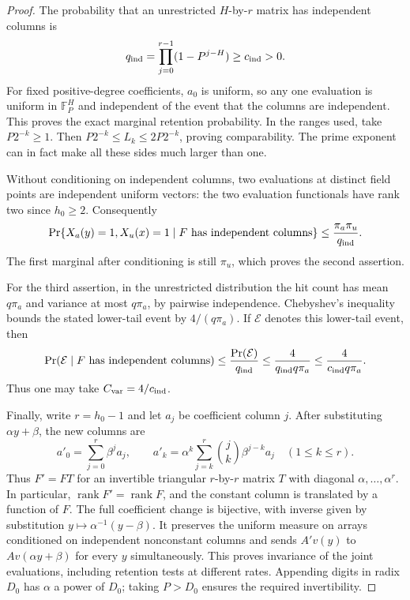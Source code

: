 \begin{proof}
The probability that an unrestricted $H$-by-$r$ matrix has independent columns is
\[
q_{\rm ind}=\prod_{j=0}^{r-1}(1-P^{j-H})\ge c_{\rm ind}>0.
\]
For fixed positive-degree coefficients, $a_0$ is uniform, so any one
evaluation is uniform in $\mathbb F_P^H$ and independent of the event that the columns are independent. This proves the exact marginal retention probability.
In the ranges used, take $P2^{-k}\ge1$. Then
$P2^{-k}\le L_k\le2P2^{-k}$, proving comparability. The prime
exponent can in fact make all these sides much larger than one.

Without conditioning on independent columns, two evaluations at distinct field
points are independent uniform vectors: the two evaluation functionals
have rank two since $h_0\ge2$. Consequently
\[
\Pr\{X_a(y)=1,X_u(x)=1\mid F\text{ has independent columns}\}
\le \frac{\pi_a\pi_u}{q_{\rm ind}}.
\]
The first marginal after conditioning is still $\pi_u$, which proves
the second assertion.

For the third assertion, in the unrestricted distribution the hit count
has mean $q\pi_a$ and variance at most $q\pi_a$, by pairwise
independence. Chebyshev's inequality bounds the stated lower-tail event
by $4/(q\pi_a)$. If $\mathcal E$ denotes this lower-tail event, then
\[
 \Pr(\mathcal E\mid F\text{ has independent columns})
 \le \frac{\Pr(\mathcal E)}{q_{\rm ind}}
 \le \frac{4}{q_{\rm ind}q\pi_a}
 \le \frac{4}{c_{\rm ind}q\pi_a}.
\]
Thus one may take $C_{\rm var}=4/c_{\rm ind}$.

Finally, write $r=h_0-1$ and let $a_j$ be coefficient column $j$.
After substituting $\alpha y+\beta$, the new columns are
\[
 a'_0=\sum_{j=0}^r\beta^j a_j,\qquad
 a'_k=\alpha^k\sum_{j=k}^r\binom jk\beta^{j-k}a_j
       \quad(1\le k\le r).
\]
Thus $F'=FT$ for an invertible triangular $r$-by-$r$ matrix $T$
with diagonal $\alpha,\ldots,\alpha^r$. In particular,
$\operatorname{rank}F'=\operatorname{rank}F$, and the constant
column is translated by a function of $F$. The full coefficient
change is bijective, with inverse given by substitution
$y\mapsto\alpha^{-1}(y-\beta)$. It preserves the uniform measure on
arrays conditioned on independent nonconstant columns and sends $A'v(y)$ to $Av(\alpha y+\beta)$
for every $y$ simultaneously. This proves invariance of the joint
evaluations, including retention tests at different rates. Appending
digits in radix $D_0$ has $\alpha$ a power of $D_0$; taking
$P>D_0$ ensures the required invertibility.
\end{proof}
